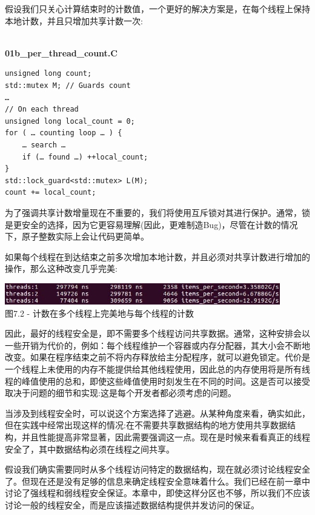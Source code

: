 假设我们只关心计算结束时的计数值，一个更好的解决方案是，在每个线程上保持本地计数，并且只增加共享计数一次:

\hspace*{\fill} \\ %
\noindent
\textbf{01b\_per\_thread\_count.C}
\begin{lstlisting}[style=styleCXX]
unsigned long count;
std::mutex M; // Guards count
…
// On each thread
unsigned long local_count = 0;
for ( … counting loop … ) {
	… search …
	if (… found …) ++local_count;
}
std::lock_guard<std::mutex> L(M);
count += local_count;
\end{lstlisting}

为了强调共享计数增量现在不重要的，我们将使用互斥锁对其进行保护。通常，锁是更安全的选择，因为它更容易理解(因此，更难制造Bug)，尽管在计数的情况下，原子整数实际上会让代码更简单。

如果每个线程在到达结束之前多次增加本地计数，并且必须对共享计数进行增加的操作，那么这种改变几乎完美:

\begin{center}
\includegraphics[width=0.9\textwidth]{content/2/chapter7/images/2.jpg}\\
图7.2 - 计数在多个线程上完美地与每个线程的计数
\end{center}

因此，最好的线程安全是，即不需要多个线程访问共享数据。通常，这种安排会以一些开销为代价的，例如：每个线程维护一个容器或内存分配器，其大小会不断地改变。如果在程序结束之前不将内存释放给主分配程序，就可以避免锁定。代价是一个线程上未使用的内存不能提供给其他线程使用，因此总的内存使用将是所有线程的峰值使用的总和，即使这些峰值使用时刻发生在不同的时间。这是否可以接受取决于问题的细节和实现:这是每个开发者都必须考虑的问题。

当涉及到线程安全时，可以说这个方案选择了逃避。从某种角度来看，确实如此，但在实践中经常出现这样的情况:在不需要共享数据结构的地方使用共享数据结构，并且性能提高非常显著，因此需要强调这一点。现在是时候来看看真正的线程安全了，其中数据结构必须在线程之间共享。


假设我们确实需要同时从多个线程访问特定的数据结构，现在就必须讨论线程安全了。但现在还是没有足够的信息来确定线程安全意味着什么。我们已经在前一章中讨论了强线程和弱线程安全保证。本章中，即使这样分区也不够，所以我们不应该讨论一般的线程安全，而是应该描述数据结构提供并发访问的保证。

